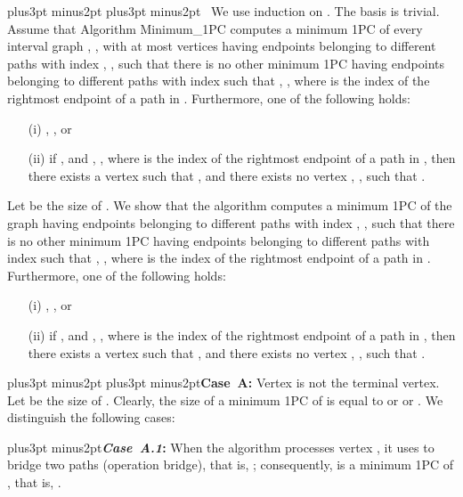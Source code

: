 \documentclass[10pt]{article}
\def\yskip{\penalty-50\vskip3pt plus3pt minus2pt}
\def\y{\yskip}
\def\yy{\yskip\yskip}
\def\s{\ }
\begin{document}
{\yy {} \s We use induction on . The basis
 is trivial. Assume that Algorithm Minimum\_1PC computes a
minimum 1PC  of every interval
graph , , with at most
 vertices having  endpoints 
belonging to different paths with index , , such that there is no other minimum 1PC
 having 
endpoints  belonging to different paths with index
 such that
, ,
where  is the index of the rightmost endpoint of a path in
. Furthermore, one of the
following holds:
\begin{itemize}
\item[(i)] , , or

\item[(ii)] if ,  and , , where  is the
index of the rightmost endpoint of a path in
, then there exists a vertex
 such that ,
 and there exists no vertex , , such that
.

\end{itemize}

\noindent Let  be the size of
. We show that the algorithm
computes a minimum 1PC  of the graph
 having  endpoints  belonging to
different paths with index , ,
such that there is no other minimum 1PC
 having 
endpoints  belonging to different paths with index
 such that
, ,
where  is the index of the rightmost endpoint of a path
in . Furthermore, one of the
following holds:
\begin{itemize}
\item[(i)] ,
, or \item[(ii)] if ,  and
, , where  is the index of the rightmost endpoint
of a path in , then there exists a
vertex  such that ,  and there exists no
vertex , , such that
.

\end{itemize}

\yy {\bf Case~A:} Vertex  is not the terminal vertex. Let
 be the size of
. Clearly, the size
 of a minimum 1PC of  is equal to
 or  or
. We distinguish the following cases:

\y {\bf \textit{Case~A.1}:} When the algorithm processes vertex
, it uses  to bridge two paths (operation bridge), that
is, ;
consequently,  is a minimum 1PC of
, that is, .

}
\end{document}
